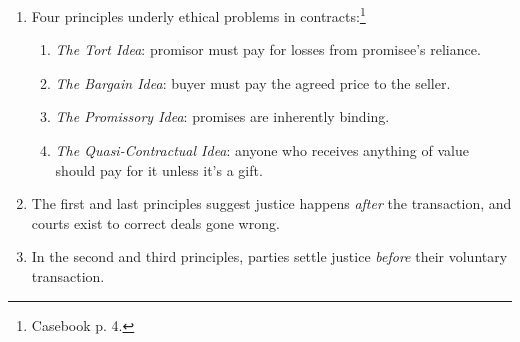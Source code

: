 \begin{enumerate}
    \item Four principles underly ethical problems in 
    contracts:\footnote{Casebook p. 4.}
    \begin{enumerate}
        \item \emph{The Tort Idea}: promisor must pay for losses from 
        promisee's reliance.
        \item \emph{The Bargain Idea}: buyer must pay the agreed price to the 
        seller.
        \item \emph{The Promissory Idea}: promises are inherently binding.
        \item \emph{The Quasi-Contractual Idea}: anyone who receives anything 
        of value should pay for it unless it's a gift.
    \end{enumerate}
    \item The first and last principles suggest justice happens \emph{after} 
    the transaction, and courts exist to correct deals gone wrong.
    \item In the second and third principles, parties settle justice 
    \emph{before} their voluntary transaction.
\end{enumerate}
